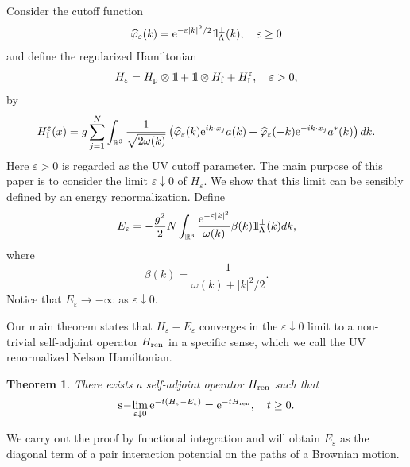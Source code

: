 \documentclass[11pt]{article}
\newtheorem{theorem}{Theorem}[section]
\newtheorem{lemma}[theorem]{Lemma}
\newcommand{\bt}[1]{\begin{theorem}\label{#1}}
\newcommand{\et}{\end{theorem}}
\newcommand{\bl}[1]{\begin{lemma}\label{#1}}
\newcommand{\el}{\end{lemma}}
\def\bbbone{{\mathchoice {\rm 1\mskip-4mu l} {\rm 1\mskip-4mu l}
{\rm 1\mskip-4.5mu l} {\rm 1\mskip-5mu l}}}
\def\one{\bbbone}
\newcommand{\kp}{\one_\Lambda^\perp(k)}
\providecommand{\eq}[1]{\begin{equation}\label{#1}}
\providecommand{\en}{\end{equation}}
\providecommand{\qed}{\hfill {$\Box$}\par\medskip}
\providecommand{\BR}{{\mathbb{R}^3 }}
\providecommand{\hni}{\hn_\ren }
\providecommand{\hn}{H}%
\providecommand{\is}{\inf \s}
\providecommand{\add}{a^\ast}
\providecommand{\hf}{H_{\rm f}}
\providecommand{\hi}{H_{\rm I}}
\providecommand{\hp}{H_{\rm p}}
\providecommand{\la}{{\Lambda}}
\providecommand{\s}{\sigma}
\providecommand{\slim}{{\rm s}\!-\!\lim}
\providecommand{\vp}{{\widehat \varphi}}
\providecommand{\vp}{\mathop{\mathrm{{\varphi}}}\nolimits}
\providecommand{\e}{{\rm e}}
\providecommand{\1}{\mathbb{1}}
\providecommand {\s}  {\ensuremath {\mathcal{S}}}
\providecommand{\eps}{\varepsilon}
\providecommand{\ren}{{\rm ren}}
\newcounter {constant}
\begin{document}
Consider the cutoff function
\eq{sasa3}
\vp_\eps(k)=\e^{-\eps|k|^2/2}\kp,\quad \eps\geq0
\en
and define the regularized Hamiltonian
\begin{equation}
\hn_\eps = \hp\otimes \one +\one \otimes \hf  + \hi^\eps,\quad \eps>0,
\end{equation}
by
\begin{equation}
\hi^\eps(x)  = g\sum_{j=1}^N \int_\BR
\frac{1}{\sqrt{2\omega(k)}} \left( \vp_\eps (k)\e^{ik\cdot x_j}
 a(k) + \vp_\eps (-k)\e^{-ik\cdot x_j}  \add(k)\right)  dk.
\end{equation}
Here $\eps>0$ is regarded as the UV cutoff parameter. The main purpose of this paper is to
consider the limit $\eps\downarrow 0$ of $\hn_\eps$. We show that this limit can be sensibly defined
by an energy renormalization. Define
\eq{sasa6}
E_\eps=-\frac{g^2}{2} N \int_{\BR} \frac{\e^{-\eps|k|^2}}{\omega(k)}\beta(k)\kp dk,
\en
where
\eq{beta}
\beta(k)=\frac{1}{\omega(k)+|k|^2/2}.
\en
Notice  that $E_\eps\to-\infty$ as $\eps\downarrow 0$.

Our main theorem states that $\hn_\eps-E_\eps$  converges in the $\eps\downarrow 0$ limit to a
non-trivial self-adjoint operator $\hni$ in a specific sense, which we call the UV renormalized
Nelson Hamiltonian.
\bt{main}
There exists a self-adjoint operator $\hni$ such that
\eq{main1}
\slim_{\eps\downarrow0}
\e^{-t(\hn_\eps-E_\eps)}=\e^{-t\hni},\quad t\geq0.
\en
\et
We carry out the proof by functional integration and will obtain $E_\eps$ as the diagonal term of a
pair interaction potential on the paths of a Brownian motion.
\end{document}
